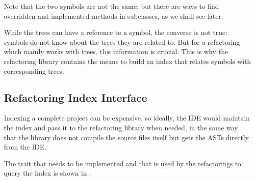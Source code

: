 Note that the two  symbols are not the same; but there are ways to find overridden and implemented methods in subclasses, as we shall see later.

While the trees can have a reference to a symbol, the converse is not true: symbols do not know about the trees they are related to. But for a refactoring which mainly works with trees, this information is crucial. This is why the refactoring library contains the means to build an index that relates symbols with corresponding trees.

\subsection{Refactoring Index Interface}

Indexing a complete project can be expensive, so ideally, the IDE would maintain the index and pass it to the refactoring library when needed, in the same way that the library does not compile the source files itself but gets the ASTs directly from the IDE.

The trait that needs to be implemented and that is used by the refactorings to query the index is shown in .

